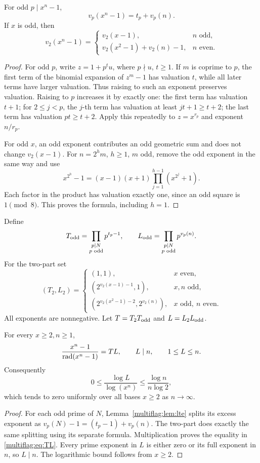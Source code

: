 \begin{lemma}\label{multiflag:lem:lte}
For odd \(p\mid x^n-1\),
\[
 v_p(x^n-1)=t_p+v_p(n).
\]
If \(x\) is odd, then
\[
 v_2(x^n-1)=
 \begin{cases}
 v_2(x-1),&n\text{ odd},\\
 v_2(x^2-1)+v_2(n)-1,&n\text{ even}.
 \end{cases}
\]
\end{lemma}
\begin{proof}
For odd \(p\), write \(z=1+p^t u\), where \(p\nmid u\), \(t\ge1\). If \(m\) is coprime to \(p\), the first term of the binomial expansion of \(z^m-1\) has valuation \(t\), while all later terms have larger valuation. Thus raising to such an exponent preserves valuation. Raising to \(p\) increases it by exactly one: the first term has valuation \(t+1\); for \(2\le j<p\), the \(j\)-th term has valuation at least \(jt+1\ge t+2\); the last term has valuation \(pt\ge t+2\). Apply this repeatedly to \(z=x^{r_p}\) and exponent \(n/r_p\).

For odd \(x\), an odd exponent contributes an odd geometric sum and does not change \(v_2(x-1)\). For \(n=2^h m\), \(h\ge1\), \(m\) odd, remove the odd exponent in the same way and use
\[
 x^{2^h}-1=(x-1)(x+1)\prod_{j=1}^{h-1}(x^{2^j}+1).
\]
Each factor in the product has valuation exactly one, since an odd square is \(1\pmod8\). This proves the formula, including \(h=1\).
\end{proof}

Define
\[
 T_{\rm odd}=\prod_{\substack{p\mid N\\p\text{ odd}}}p^{t_p-1},\qquad
 L_{\rm odd}=\prod_{\substack{p\mid N\\p\text{ odd}}}p^{v_p(n)}.
\]
For the two-part set
\[
 (T_2,L_2)=
 \begin{cases}
 (1,1),&x\text{ even},\\
 (2^{v_2(x-1)-1},1),&x,n\text{ odd},\\
 (2^{v_2(x^2-1)-2},2^{v_2(n)}),&x\text{ odd},\ n\text{ even}.
 \end{cases}
\]
All exponents are nonnegative. Let \(T=T_2T_{\rm odd}\) and \(L=L_2L_{\rm odd}\).

\begin{theorem}\label{multiflag:thm:lift}
For every \(x\ge2,n\ge1\),
\begin{equation}\label{multiflag:eq:TL}
 \frac{x^n-1}{\operatorname{rad}(x^n-1)}=TL,\qquad L\mid n,\qquad 1\le L\le n.
\end{equation}
Consequently
\[
 0\le\frac{\log L}{\log(x^n)}\le\frac{\log n}{n\log2},
\]
which tends to zero uniformly over all bases \(x\ge2\) as \(n\to\infty\).
\end{theorem}
\begin{proof}
For each odd prime of \(N\), Lemma~\ref{multiflag:lem:lte} splits its excess exponent as
\(v_p(N)-1=(t_p-1)+v_p(n)\). The two-part does exactly the same splitting using its separate formula. Multiplication proves the equality in \eqref{multiflag:eq:TL}. Every prime exponent in \(L\) is either zero or its full exponent in \(n\), so \(L\mid n\). The logarithmic bound follows from \(x\ge2\).
\end{proof}

